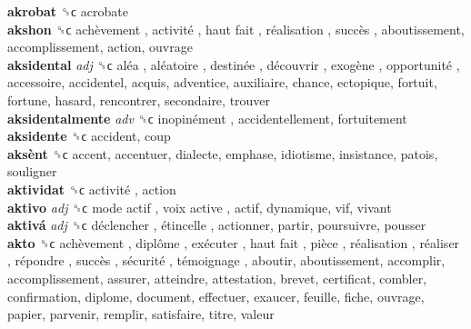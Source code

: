 \textbf{akrobat} ␝ϲ  acrobate  \\
\textbf{akshon} ␝ϲ   achèvement ,  activité ,  haut fait ,  réalisation ,  succès , aboutissement, accomplissement, action, ouvrage  \\
\textbf{aksidental} \emph{adj}  ␝ϲ   aléa ,  aléatoire ,  destinée ,  découvrir ,  exogène ,  opportunité , accessoire, accidentel, acquis, adventice, auxiliaire, chance, ectopique, fortuit, fortune, hasard, rencontrer, secondaire, trouver  \\
\textbf{aksidentalmente} \emph{adv}  ␝ϲ   inopinément , accidentellement, fortuitement  \\
\textbf{aksidente} ␝ϲ  accident, coup  \\
\textbf{aksènt} ␝ϲ  accent, accentuer, dialecte, emphase, idiotisme, insistance, patois, souligner  \\
\textbf{aktividat} ␝ϲ   activité , action  \\
\textbf{aktivo} \emph{adj}  ␝ϲ   mode actif ,  voix active , actif, dynamique, vif, vivant  \\
\textbf{aktivá} \emph{adj}  ␝ϲ   déclencher ,  étincelle , actionner, partir, poursuivre, pousser  \\
\textbf{akto} ␝ϲ   achèvement ,  diplôme ,  exécuter ,  haut fait ,  pièce ,  réalisation ,  réaliser ,  répondre ,  succès ,  sécurité ,  témoignage , aboutir, aboutissement, accomplir, accomplissement, assurer, atteindre, attestation, brevet, certificat, combler, confirmation, diplome, document, effectuer, exaucer, feuille, fiche, ouvrage, papier, parvenir, remplir, satisfaire, titre, valeur  \\
